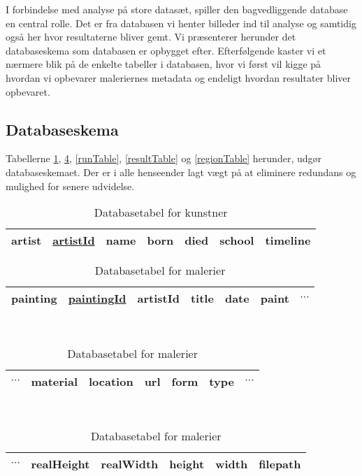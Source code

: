 {
{\sffamily I forbindelse med analyse på store datasæt, spiller den
bagvedliggende database en central rolle. Det er fra databasen vi henter
billeder ind til analyse og samtidig også her hvor resultaterne bliver gemt. Vi
præsenterer herunder det databaseskema som databasen er opbygget efter.
Efterfølgende kaster vi et nærmere blik på de enkelte tabeller i
databasen, hvor vi først vil kigge på hvordan vi opbevarer
maleriernes metadata og endeligt hvordan resultater bliver opbevaret.
}

\subsection{Databaseskema}
Tabellerne \ref{artistTable}, \ref{paintingTable}, \ref{runTable},
\ref{resultTable} og \ref{regionTable} herunder, udgør databaseskemaet.
Der er i alle henseender lagt vægt på at eliminere redundans og mulighed
for senere udvidelse.

\begin{table}[!h]
    \centering
    \begin{tabular}{|l||c|c|c|c|c|c|}
        \hline
        \bf{artist} \hspace{0.5cm} & \underline{artistId} & name & born & died & school & timeline \\\hline
    \end{tabular}
    \caption{Databasetabel for kunstner}
    \label{artistTable}
\end{table}

\begin{table}[!h]
    \centering
    \begin{tabular}{|l||c|c|c|c|c|c}
        \hline
        \bf{painting} \hspace{0.5cm} & \underline{paintingId} & artistId & title & date & paint & $\cdots$ \\\hline
    \end{tabular}\\ \vspace{0.2cm}\hspace{1.2cm}
    \begin{tabular}{c|c|c|c|c|c|c}
        \hline
        $\cdots$ & material & location & url & form & type & $\cdots$ \\\hline
    \end{tabular}\\ \vspace{0.2cm}\hspace{1.4cm}
    \begin{tabular}{c|c|c|c|c|c|}
        \hline
        $\cdots$ & realHeight & realWidth & height & width & filepath \\\hline
    \end{tabular}
    \caption{Databasetabel for malerier}
    \label{paintingTable}
\end{table}

}
